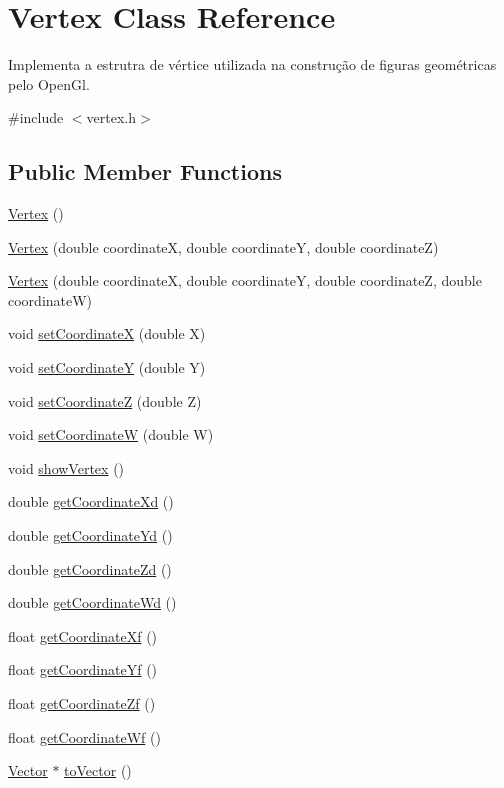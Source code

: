 \hypertarget{class_vertex}{\section{Vertex Class Reference}
\label{class_vertex}
}


Implementa a estrutra de vértice utilizada na construção de figuras geométricas pelo Open\-Gl.  




{\ttfamily \#include $<$vertex.\-h$>$}

\subsection*{Public Member Functions}
\begin{DoxyCompactItemize}
\item 
\hyperlink{class_vertex_a97488994a2482d70da74e1b91d40e169}{Vertex} ()
\item 
\hyperlink{class_vertex_a4c878f3948c7d0d8e2629e86e4950242}{Vertex} (double coordinate\-X, double coordinate\-Y, double coordinate\-Z)
\item 
\hyperlink{class_vertex_afd245b9afdb93803b7497017e0320655}{Vertex} (double coordinate\-X, double coordinate\-Y, double coordinate\-Z, double coordinate\-W)
\item 
void \hyperlink{class_vertex_a50dd8bfc6a23bb65b0282adddebda09b}{set\-Coordinate\-X} (double X)
\item 
void \hyperlink{class_vertex_a8fab5108447937fac0d71269d2c76576}{set\-Coordinate\-Y} (double Y)
\item 
void \hyperlink{class_vertex_adaa2a4716d4ea9cb382fa504b76db135}{set\-Coordinate\-Z} (double Z)
\item 
void \hyperlink{class_vertex_a334e31a87aaf937f5ee6fc9f7f479f85}{set\-Coordinate\-W} (double W)
\item 
void \hyperlink{class_vertex_aa5d082eb4252de4e6728593ae4ce054b}{show\-Vertex} ()
\item 
double \hyperlink{class_vertex_aa0fe7e6340ff9eeceefd82047bf74d66}{get\-Coordinate\-Xd} ()
\item 
double \hyperlink{class_vertex_a5b02582fab5d4eec99066a9dc5e0bf5b}{get\-Coordinate\-Yd} ()
\item 
double \hyperlink{class_vertex_ad80796c061f7811be48f224bd6080207}{get\-Coordinate\-Zd} ()
\item 
double \hyperlink{class_vertex_abb8f53afc49d84898de8a434f29be6dc}{get\-Coordinate\-Wd} ()
\item 
float \hyperlink{class_vertex_a025803bbc8f7dd5b3927005c8a3d81fb}{get\-Coordinate\-Xf} ()
\item 
float \hyperlink{class_vertex_a6d63b1729d9c1f9ae759b9e886067f0e}{get\-Coordinate\-Yf} ()
\item 
float \hyperlink{class_vertex_a8e7165fa90b48a3d5761e00dde9e6686}{get\-Coordinate\-Zf} ()
\item 
float \hyperlink{class_vertex_ab3aa510b5f323c74e5ac02eec0c99ce0}{get\-Coordinate\-Wf} ()
\item 
\hyperlink{class_vector}{Vector} $\ast$ \hyperlink{class_vertex_ac3418aa58ec05b24d961d1ba644c8727}{to\-Vector} ()
\end{DoxyCompactItemize}


